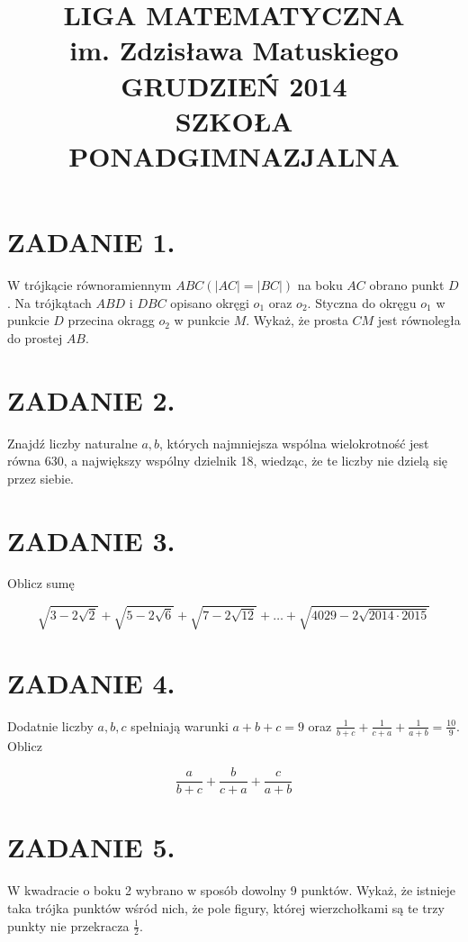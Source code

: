 \documentclass[10pt]{article}
\title{LIGA MATEMATYCZNA \\
 im. Zdzisława Matuskiego \\
 GRUDZIEŃ 2014 \\
 SZKOŁA PONADGIMNAZJALNA }
\author{}
\date{}
\begin{document}
\maketitle
\section*{ZADANIE 1.}
W trójkącie równoramiennym \(A B C(|A C|=|B C|)\) na boku \(A C\) obrano punkt \(D\). Na trójkątach \(A B D\) i \(D B C\) opisano okręgi \(o_{1}\) oraz \(o_{2}\). Styczna do okręgu \(o_{1}\) w punkcie \(D\) przecina okragg \(o_{2}\) w punkcie \(M\). Wykaż, że prosta \(C M\) jest równoległa do prostej \(A B\).

\section*{ZADANIE 2.}
Znajdź liczby naturalne \(a, b\), których najmniejsza wspólna wielokrotność jest równa 630, a największy wspólny dzielnik 18, wiedząc, że te liczby nie dzielą się przez siebie.

\section*{ZADANIE 3.}
Oblicz sumę

\[
\sqrt{3-2 \sqrt{2}}+\sqrt{5-2 \sqrt{6}}+\sqrt{7-2 \sqrt{12}}+\ldots+\sqrt{4029-2 \sqrt{2014 \cdot 2015}}
\]

\section*{ZADANIE 4.}
Dodatnie liczby \(a, b, c\) spełniają warunki \(a+b+c=9\) oraz \(\frac{1}{b+c}+\frac{1}{c+a}+\frac{1}{a+b}=\frac{10}{9}\). Oblicz

\[
\frac{a}{b+c}+\frac{b}{c+a}+\frac{c}{a+b}
\]

\section*{ZADANIE 5.}
W kwadracie o boku 2 wybrano w sposób dowolny 9 punktów. Wykaż, że istnieje taka trójka punktów wśród nich, że pole figury, której wierzchołkami są te trzy punkty nie przekracza \(\frac{1}{2}\).
\end{document}
